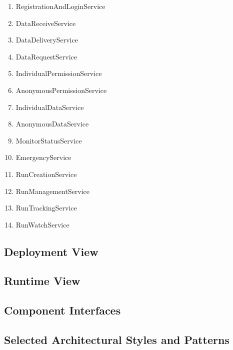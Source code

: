 \documentclass[a4paper]{article}
\begin{document}
\begin{enumerate}
    \item RegistrationAndLoginService
    \item DataReceiveService %
    \item DataDeliveryService %
    \item DataRequestService %
    \item IndividualPermissionService %
    \item AnonymousPermissionService %
    \item IndividualDataService %
    \item AnonymousDataService %
    
    \item MonitorStatusService
    \item EmergencyService
    
    \item RunCreationService %
    \item RunManagementService %
    \item RunTrackingService %
    \item RunWatchService %
    
\end{enumerate}

\subsection{Deployment View}
\clearpage

\subsection{Runtime View}

\subsection{Component Interfaces}

\subsection{Selected Architectural Styles and Patterns}
\end{document}
